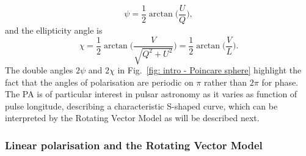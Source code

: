 \begin{equation}
    \label{eq: position angle definition}
    \psi = \frac{1}{2}\arctan\bigg(\frac{U}{Q}\bigg),
\end{equation}
and the ellipticity angle is 
\begin{equation}
    \label{eq: ellipticity angle definition}
    \chi = \frac{1}{2}\arctan\bigg(\frac{V}{\sqrt{Q^2 + U^2}}\bigg) = \frac{1}{2}\arctan\bigg(\frac{V}{L}\bigg).
\end{equation}
The double angles $2\psi$ and $2\chi$ in Fig.~\ref{fig: intro - Poincare sphere} highlight the fact that the angles of polarisation are periodic on $\pi$ rather than $2\pi$ for phase. The PA is of particular interest in pulsar astronomy as it varies as function of pulse longitude, describing a characteristic S-shaped curve, which can be interpreted by the Rotating Vector Model as will be described next.


\subsubsection{Linear polarisation and the Rotating Vector Model}
\label{sec: intro - emission models - polarisation - RVM}

